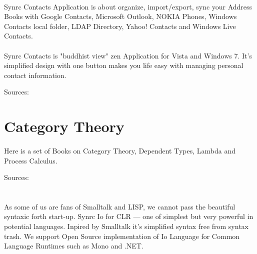 \documentclass[11pt]{article}
\begin{document}
\paragraph{}
Synrc Contacts Application is about organize,
import/export, sync your Address Books with Google Contacts,
Microsoft Outlook, NOKIA Phones, Windows Contacts local folder,
LDAP Directory, Yahoo! Contacts and Windows Live Contacts.
\paragraph{}
Synrc Contacts is "buddhist view" zen Application for
Vista and Windows 7. It's simplified design with one button
makes you life easy with managing personal contact information.

Sources: 



\section*{Category Theory}
\paragraph{}
Here is a set of Books on Category Theory, Dependent Types, Lambda and Process Calculus.

Sources: 

\section*{}

\paragraph{}
As some of us are fans of Smalltalk and LISP, we cannot pass the
beautiful syntaxic forth start-up. Synrc Io for CLR --- one of simplest but very
powerful in potential languages. Inpired by Smalltalk it's simplified
syntax free from syntax trash. We support Open Source implementation
of Io Language for Common Language Runtimes such as Mono and .NET.
\end{document}
